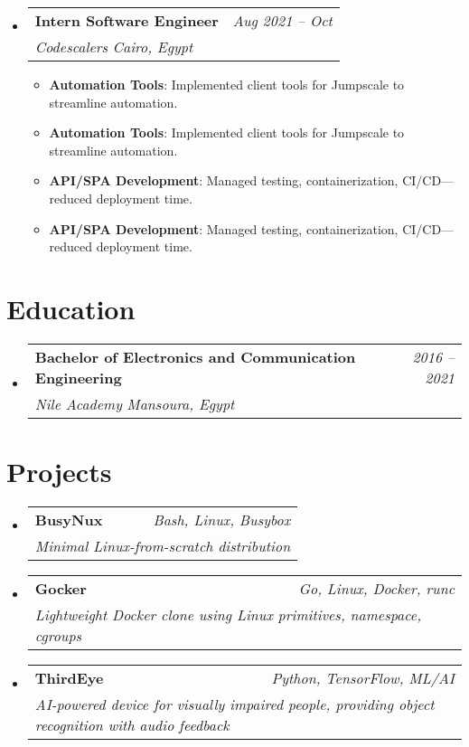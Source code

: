 \documentclass[a4paper,11pt]{article}
\makeatletter
\newcommand{\resumeSubheading}[4]{
  \item[]
    \begin{tabular*}{0.97\textwidth}[t]{l@{\extracolsep{\fill}}r}
      \textbf{#1} & \textit{#2} \\
      \multicolumn{2}{l}{\hspace{0.5em}\textit{\small #3} \hfill \textit{\small #4}} \\
    \end{tabular*}\vspace{-7pt}
}
\newcommand{\resumeItem}[2][]{%
  \if\relax\detokenize{#1}\relax
    \item \small{#2}%
  \else
    \item[] \small{#2}\vspace{#1}%
  \fi
}
\newcommand{\resumeListStart}[1][0.15in]{\begin{itemize}[leftmargin=#1,label=\textbullet]}
\newcommand{\resumeListEnd}{\end{itemize}\vspace{-7pt}}
\makeatother
\begin{document}
\resumeListStart
  \resumeSubheading
    {Intern Software Engineer}{Aug 2021 -- Oct}
    {Codescalers}{Cairo, Egypt}
    \resumeListStart[0.3in]
      \resumeItem{\textbf{Automation Tools}: Implemented client tools for Jumpscale to streamline automation.}
      \resumeItem{\textbf{API/SPA Development}: Managed testing, containerization, CI/CD—reduced deployment time.}
    \resumeListEnd
\resumeListEnd

\section{Education}
\resumeListStart
  \resumeSubheading
    {Bachelor of Electronics and Communication Engineering}{2016 -- 2021}
    {Nile Academy}{Mansoura, Egypt}
\resumeListEnd

\section{Projects}
\resumeListStart
  \resumeSubheading{BusyNux}{Bash, Linux, Busybox}{Minimal Linux-from-scratch distribution}{}
  \resumeSubheading{Gocker}{Go, Linux, Docker, runc}{Lightweight Docker clone using Linux primitives, namespace, cgroups}{}
  \resumeSubheading{ThirdEye}{Python, TensorFlow, ML/AI}{AI-powered device for visually impaired people, providing object recognition with audio feedback}{}
\resumeListEnd
\end{document}
